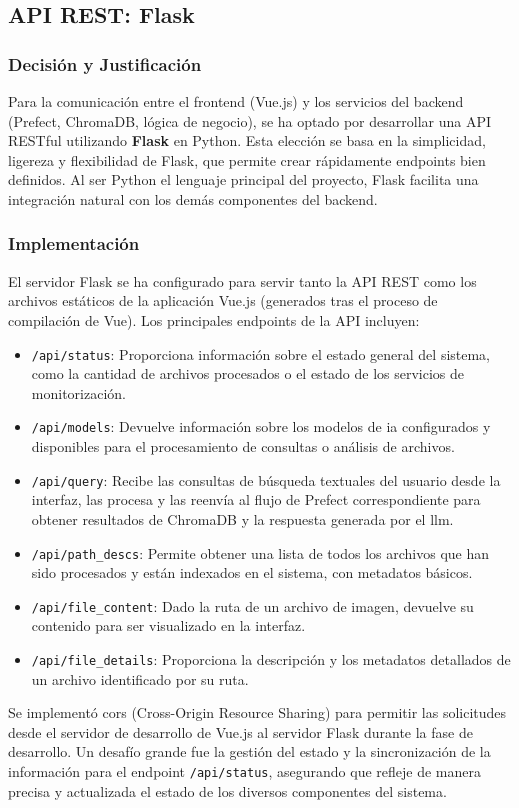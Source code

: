 \subsection{API REST: Flask}
\label{subsec:decision_api}
\subsubsection{Decisión y Justificación}
Para la comunicación entre el frontend (Vue.js) y los servicios del backend (Prefect, ChromaDB, lógica de negocio), se ha optado por desarrollar una API RESTful utilizando \textbf{Flask} en Python. Esta elección se basa en la simplicidad, ligereza y flexibilidad de Flask, que permite crear rápidamente endpoints bien definidos. Al ser Python el lenguaje principal del proyecto, Flask facilita una integración natural con los demás componentes del backend.

\subsubsection{Implementación}
El servidor Flask se ha configurado para servir tanto la API REST como los archivos estáticos de la aplicación Vue.js (generados tras el proceso de compilación de Vue). Los principales endpoints de la API incluyen:
\begin{itemize}
    \item \texttt{/api/status}: Proporciona información sobre el estado general del sistema, como la cantidad de archivos procesados o el estado de los servicios de monitorización.
    \item \texttt{/api/models}: Devuelve información sobre los modelos de \gls{ia} configurados y disponibles para el procesamiento de consultas o análisis de archivos.
    \item \texttt{/api/query}: Recibe las consultas de búsqueda textuales del usuario desde la interfaz, las procesa y las reenvía al flujo de Prefect correspondiente para obtener resultados de ChromaDB y la respuesta generada por el \gls{llm}.
    \item \texttt{/api/path\_descs}: Permite obtener una lista de todos los archivos que han sido procesados y están indexados en el sistema, con metadatos básicos.
    \item \texttt{/api/file\_content}: Dado la ruta de un archivo de imagen, devuelve su contenido para ser visualizado en la interfaz.
    \item \texttt{/api/file\_details}: Proporciona la descripción y los metadatos detallados de un archivo identificado por su ruta.
\end{itemize}
Se implementó \gls{cors} (Cross-Origin Resource Sharing) para permitir las solicitudes desde el servidor de desarrollo de Vue.js al servidor Flask durante la fase de desarrollo. Un desafío grande fue la gestión del estado y la sincronización de la información para el endpoint \texttt{/api/status}, asegurando que refleje de manera precisa y actualizada el estado de los diversos componentes del sistema.

